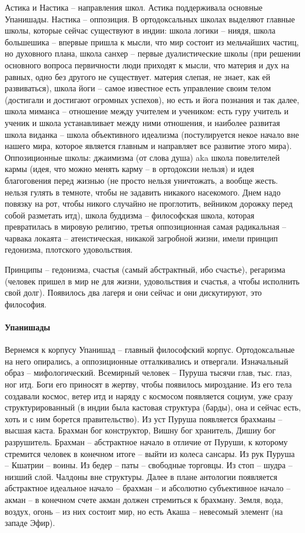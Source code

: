 \documentclass[a4paper, 12pt]{article}
\begin{document}
Астика и Настика -- направления школ. Астика поддерживала основные Упанишады. Настика -- оппозиция. В ортодоксальных школах выделяют главные школы, которые сейчас существуют в индии: школа логики -- ниядя, школа большешика -- впервые пришла к мысли, что мир состоит из мельчайших частиц, но духовного плана, школа санхер -- первые дуалистические школы (при решении основного вопроса первичности люди приходят к мысли, что материя и дух на равных, одно без другого не существует. материя слепая, не знает, как ей развиваться), школа йоги -- самое известное есть управление своим телом (достигали и достигают огромных успехов), но  есть и йога познания и так далее, школа миманса -- отношение между учителем и учеником: есть гуру учитель и ученик и школа устанавливает между ними отношения, и наиболее развитая школа виданка -- школа объективного идеализма (постулируется некое начало вне нашего мира, которое является главным и направляет все развитие этого мира). Оппозиционные школы: джаимизма (от слова душа) aka школа повелителей кармы (идея, что можно менять карму -- в ортодоксии нельзя) и идея благоговения перед жизнью (не просто нельзя уничтожать, а вообще жесть. нельзя гулять в темноте, чтобы не задавить никакого насекомого. Днем надо повязку на рот, чтобы никого случайно не проглотить, вейником дорожку перед собой разметать итд), школа буддизма -- философская школа, которая превратилась в мировую религию, третья оппозиционная самая радикальная -- чарвака локаята -- атеистическая, никакой загробной жизни, имели принцип гедонизма, плотского удовольствия. 

Принципы -- гедонизма, счастья (самый абстрактный, ибо счастье), регаризма (человек пришел в мир не для жизни, удовольствия и счастья, а чтобы исполнить свой долг). Появилось два лагеря и они сейчас и они дискутируют, это философия. 

\paragraph{Упанишады}
Вернемся к корпусу Упанишад -- главный философский корпус. Ортодоксальные на него опирались, а оппозиционные отталкивались и отвергали. Изначальный образ -- мифологический. Всемирный человек -- Пуруша тысячи глав, тыс. глаз, ног итд. Боги его приносят в жертву, чтобы появилось мироздание. Из его тела создавали космос, ветер итд и наряду с космосом появляется социум, уже сразу структурированный (в индии была кастовая структура (барды), она и сейчас есть, хоть и с ним борется правительство). Из уст Пуруша появляется брахманы -- высшая каста. Брахман бог конструктор, Вишну бог хранитель, Дишиу бог разрушитель. Брахман -- абстрактное начало в отличие от Пуруши, к которому стремится человек в конечном итоге -- выйти из колеса сансары. Из рук Пуруша -- Кшатрии -- воины. Из бедер -- паты -- свободные торговцы. Из стоп -- шудра -- низший слой. Чалдоны вне структуры. Далее в плане антологии появляется абстрактное идеальное начало -- брахман -- и абсолютно субъективное начало -- акман -- в конечном счете акман должен стремиться к брахману. Земля, вода, воздух, огонь -- из них состоит мир, но есть Акаша -- невесомый элемент (на западе Эфир). 
\end{document}
